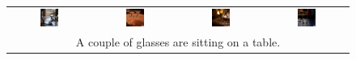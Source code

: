 \begin{figure}[ht!]
\begin{tabular}{cccc}
        \includegraphics[width=0.24\textwidth]{figures/cross/glass_0.jpg} &
        \includegraphics[width=0.24\textwidth]{figures/cross/glass_1.jpg} &
        \includegraphics[width=0.24\textwidth]{figures/cross/glass_2.jpg} &
        \includegraphics[width=0.24\textwidth]{figures/cross/glass_3.jpg} \vspace{-1mm}\\
        \multicolumn{4}{c}{\small A couple of glasses are sitting on a table.}\\
        

\end{tabular}
\end{figure}
